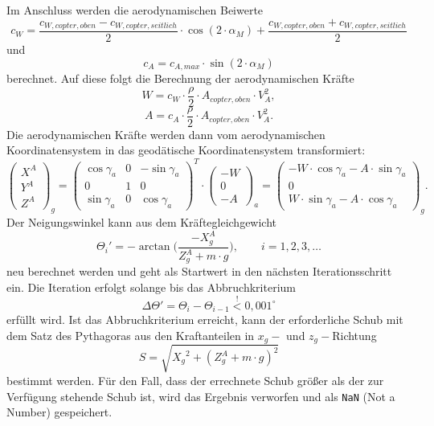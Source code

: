 Im Anschluss werden die aerodynamischen Beiwerte 
\begin{equation}
	c_W = \frac{c_{W,copter,oben}-c_{W,copter,seitlich}}{2}\cdot \cos(2\cdot \alpha_M)+\frac{c_{W,copter,oben}+c_{W,copter,seitlich}}{2}
\end{equation} und 
\begin{equation}
	c_A = c_{A,max}\cdot \sin(2\cdot \alpha_M)
\end{equation}
berechnet. Auf diese folgt die Berechnung der aerodynamischen Kräfte
\begin{equation}
	W = c_W\cdot \frac{\rho}{2}\cdot A_{copter,oben}\cdot V_A^2, \label{eq:widerstand}
\end{equation}
\begin{equation}
	A = c_A\cdot \frac{\rho}{2}\cdot A_{copter,oben}\cdot V_A^2.
\end{equation}
Die aerodynamischen Kräfte werden dann vom aerodynamischen Koordinatensystem in das geodätische Koordinatensystem transformiert:
\begin{equation}
	\begin{pmatrix} X^A \\ Y^A \\Z^A \end{pmatrix}_g = \begin{pmatrix} \cos\gamma_a & 0 & -\sin\gamma_a \\ 0 & 1 & 0 \\ \sin\gamma_a & 0 & \cos\gamma_a \end{pmatrix}^T\cdot \begin{pmatrix} -W \\ 0 \\ -A \end{pmatrix}_a = \begin{pmatrix} -W\cdot\cos\gamma_a-A\cdot\sin\gamma_a \\ 0 \\ W\cdot\sin\gamma_a-A\cdot\cos\gamma_a \end{pmatrix}_g.
\end{equation}
Der Neigungswinkel kann aus dem Kräftegleichgewicht
\begin{equation}
	\Theta_i' = -\arctan\Big(\frac{-X_g^A}{Z_g^A + m\cdot g}\Big), \qquad i =1,2,3,\dots
	\label{eq:neigungswinkel}
\end{equation}
neu berechnet werden und geht als Startwert in den nächsten Iterationsschritt ein. Die Iteration erfolgt solange bis das Abbruchkriterium
\begin{equation}
	\Delta\Theta' = \Theta_i-\Theta_{i-1}\stackrel{!}{<}0,001^{\circ}
\end{equation}
erfüllt wird. 
Ist das Abbruchkriterium erreicht, kann der erforderliche Schub mit dem Satz des Pythagoras aus den Kraftanteilen in \(x_g-\) und \(z_g-\)Richtung
\begin{equation}
	S = \sqrt{{X_g}^2+(Z_g^A+m\cdot g)^2}
	\label{eq:schub_multicopter}
\end{equation}
bestimmt werden.
Für den Fall, dass der errechnete Schub größer als der zur Verfügung stehende Schub ist, wird das Ergebnis verworfen und als \texttt{NaN} (Not a Number) gespeichert.



